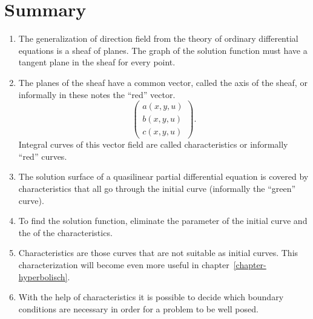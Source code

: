 \section{Summary}
\begin{enumerate}
\item
The generalization of direction field from the theory of ordinary
differential equations is a sheaf of planes.
The graph of the solution function must have a tangent plane in the 
sheaf for every point.
\item
The planes of the sheaf have a common vector, called the axis of the sheaf,
or informally in these notes the ``red'' vector.
\[
\begin{pmatrix}
a(x,y,u)\\
b(x,y,u)\\
c(x,y,u)
\end{pmatrix}.
\]
Integral curves of this vector field are called characteristics
or informally ``red'' curves.
\item
The solution surface of a quasilinear partial differential equation
is covered by characteristics that all go through the initial curve
(informally the ``green'' curve).
\item
To find the solution function, eliminate the parameter of the initial
curve and the of the characteristics.
\item
Characteristics are those curves that are not suitable as initial
curves.
This characterization will become even more useful in
chapter~\ref{chapter-hyperbolisch}.
\item
With the help of characteristics it is possible to decide which boundary
conditions are necessary in order for a problem to be well posed.
\end{enumerate}
